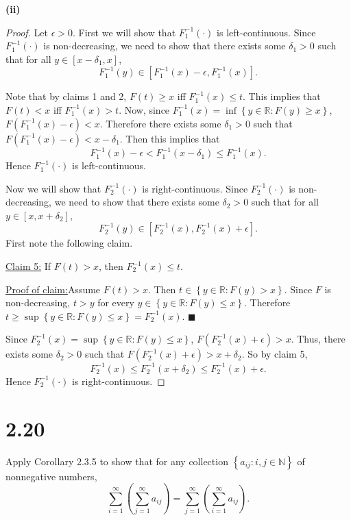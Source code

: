 \documentclass[12pt]{article}
\newenvironment{claimproof}[1]{\par\noindent\underline{Proof of claim:}\space#1}{\hfill $\blacksquare$\vspace{5mm}}
\begin{document}
{\bf (ii)}
\begin{proof}
Let $\epsilon > 0$. First we will show that $F_{1}^{-1}(\cdot)$ is left-continuous. Since $F_{1}^{-1}(\cdot)$ is non-decreasing, we need to show 
that there exists some $\delta_{1} > 0$ such that for all $y\in [x - \delta_{1}, x]$,
\[ F_{1}^{-1}(y) \in \left[ F_{1}^{-1}(x) - \epsilon, F_{1}^{-1}(x) \right]. \]

Note that by claims 1 and 2, $F(t) \geq x$ iff $F_{1}^{-1}(x) \leq t$. This implies that $F(t) < x$ iff $F_{1}^{-1}(x) > t$. 
Now, since $F_{1}^{-1}(x) = \inf\left\{ y \in \mathbb{R} : F(y) \geq x \right\}$, $F(F_{1}^{-1}(x) - \epsilon) < x$. Therefore there exists some
$\delta_{1} > 0$ such that $F(F_{1}^{-1}(x) - \epsilon) < x - \delta_{1}$. Then this implies that 
\[ F_{1}^{-1}(x) - \epsilon < F_{1}^{-1}(x - \delta_{1}) \leq F_{1}^{-1}(x). \]
Hence $F_{1}^{-1}(\cdot)$ is left-continuous.

Now we will show that $F_{2}^{-1}(\cdot)$ is right-continuous. Since $F_{2}^{-1}(\cdot)$ is non-decreasing, we need to show that there exists some
$\delta_{2} > 0$ such that for all $y \in [x, x + \delta_{2}]$,
\[ F_{2}^{-1}(y) \in \left[ F_{2}^{-1}(x), F_{2}^{-1}(x) + \epsilon \right].\] 
First note the following claim.

\underline{Claim 5:} If $F(t) > x$, then $F_{2}^{-1}(x) \leq t$.
\begin{claimproof}
Assume $F(t) > x$. Then $t \in \left\{ y \in \mathbb{R} : F(y) > x \right\}$. Since $F$ is non-decreasing, $t > y$ for every $y \in \left\{ y \in
\mathbb{R} : F(y) \leq x \right\}$. Therefore $t \geq \sup\left\{ y \in \mathbb{R} : F(y) \leq x \right\} = F_{2}^{-1}(x)$.
\end{claimproof}

Since $F_{2}^{-1}(x) = \sup\left\{ y \in \mathbb{R} : F(y) \leq x \right\}$, $F(F_{2}^{-1}(x) + \epsilon) > x$. Thus, there exists some $\delta_{2} >
0$ such that $F(F_{2}^{-1}(x) + \epsilon) > x + \delta_{2}$. So by claim 5,
\[ F_{2}^{-1}(x) \leq F_{2}^{-1}(x + \delta_{2}) \leq F_{2}^{-1}(x) + \epsilon. \]
Hence $F_{2}^{-1}(\cdot)$ is right-continuous.
\end{proof}

\newpage
\section*{2.20}
Apply Corollary 2.3.5 to show that for any collection $\left\{ a_{ij} : i, j \in \mathbb{N} \right\}$ of nonnegative numbers,
\[ \sum_{i=1}^{\infty}\left(\sum_{j=1}^{\infty}a_{ij}\right) = \sum_{j=1}^{\infty}\left(\sum_{i=1}^{\infty}a_{ij}\right). \]
\end{document}

